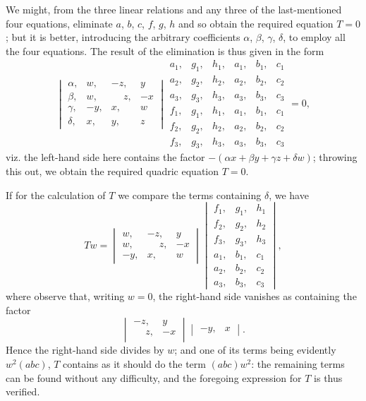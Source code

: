 \documentclass[12pt,a4paper]{article}
\theoremstyle{cayley}
\theoremstyle{definition}
\numberwithin{equation}{section}
\begin{document}
We might, from the three linear relations and any three of the last-mentioned four equations, eliminate $a$, $b$, $c$, $f$, $g$, $h$ and so obtain the required equation $T = 0$; but it is better, introducing the arbitrary coefficients $\alpha$, $\beta$, $\gamma$, $\delta$, to employ all the four equations. The result of the elimination is thus given in the form
\[
\begin{vmatrix}
\alpha, & w, & -z, & y \\
\beta, & w, & \phantom{-}z, & -x \\
\gamma, & -y, & x, & w \\
\delta, & x, & y, & z
\end{vmatrix}
\begin{matrix}
a_1, & g_1, & h_1, & a_1, & b_1, & c_1 \\
a_2, & g_2, & h_2, & a_2, & b_2, & c_2 \\
a_3, & g_3, & h_3, & a_3, & b_3, & c_3 \\
f_1, & g_1, & h_1, & a_1, & b_1, & c_1 \\
f_2, & g_2, & h_2, & a_2, & b_2, & c_2 \\
f_3, & g_3, & h_3, & a_3, & b_3, & c_3
\end{matrix} = 0,
\]
viz. the left-hand side here contains the factor $-(\alpha x + \beta y + \gamma z + \delta w)$; throwing this out, we obtain the required quadric equation $T=0$.

If for the calculation of $T$ we compare the terms containing $\delta$, we have
\[
Tw =
\begin{vmatrix}
w, & -z, & y \\
w, & \phantom{-}z, & -x \\
-y, & x, & w
\end{vmatrix}
\begin{vmatrix}
f_1, & g_1, & h_1 \\
f_2, & g_2, & h_2 \\
f_3, & g_3, & h_3 \\
a_1, & b_1, & c_1 \\
a_2, & b_2, & c_2 \\
a_3, & b_3, & c_3
\end{vmatrix},
\]
where observe that, writing $w = 0$, the right-hand side vanishes as containing the factor
\[
\begin{vmatrix} -z, & y \\ \phantom{-}z, & -x \\ \end{vmatrix}
\begin{vmatrix} -y, & x \end{vmatrix}.
\]
Hence the right-hand side divides by $w$; and one of its terms being evidently $w^2 (abc)$, $T$ contains as it should do the term $(abc)w^2$: the remaining terms can be found without any difficulty, and the foregoing expression for $T$ is thus verified.
\end{document}
